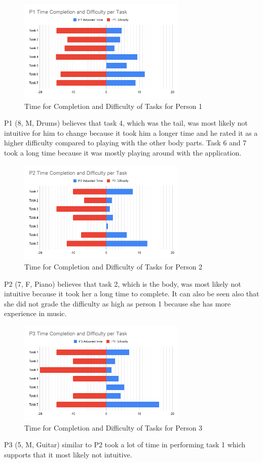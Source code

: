 \begin{figure}[H]
    \centering
    \includegraphics[width=8cm]{NewFigures/P1.png}
    \caption{Time for Completion and Difficulty of Tasks for Person 1}
    \label{fig:P1Timing}
\end{figure}
 P1 (8, M, Drums) believes that task 4, which was the tail, was most likely not intuitive for him to change because it took him a longer time and he rated it as a higher difficulty compared to playing with the other body parts. Task 6 and 7 took a long time because it was mostly playing around with the application.
 
\begin{figure}[H]
    \centering
    \includegraphics[width=8cm]{NewFigures/P2.png}
    \caption{Time for Completion and Difficulty of Tasks for Person 2}
    \label{fig:P2Timing}
\end{figure}
P2 (7, F, Piano) believes that task 2, which is the body, was most likely not intuitive because it took her a long time to complete. It can also be seen also that she did not grade the difficulty as high as person 1 because she has more experience in music.

\begin{figure}[H]
    \centering
    \includegraphics[width=8cm]{NewFigures/P3.png}
    \caption{Time for Completion and Difficulty of Tasks for Person 3}
    \label{fig:P3Timing}
\end{figure}
P3 (5, M, Guitar) similar to P2 took a lot of time in performing task 1 which supports that it most likely not intuitive.


